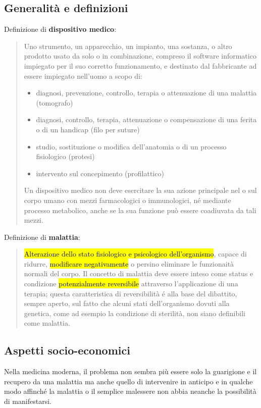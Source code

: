 \documentclass[a4paper]{article}
\begin{document}
\subsection{Generalità e definizioni}
Definizione di \textbf{dispositivo medico}:
\begin{quote}
    \centering
    Uno strumento, un apparecchio, un impianto, una sostanza, o altro prodotto 
    usato da solo o in combinazione, compreso il software informatico impiegato 
    per il suo corretto funzionamento, e destinato dal fabbricante ad essere 
    impiegato nell'uomo a scopo di:
    \begin{itemize}
        \item diagnosi, prevenzione, controllo, terapia o attenuazione di una 
        malattia (tomografo)
        \item diagnosi, controllo, terapia, attenuazione o compensazione di 
        una ferita o di un handicap (filo per suture)
        \item studio, sostituzione o modifica dell'anatomia o di un processo 
        fisiologico (protesi)
        \item intervento sul concepimento (profilattico)
    \end{itemize}
    Un dispositivo medico non deve esercitare la sua azione principale nel o 
    sul corpo umano con mezzi farmacologici o immunologici, né mediante processo 
    metabolico, anche se la sua funzione può essere coadiuvata da tali mezzi. 
\end{quote}
Definizione di \textbf{malattia}:
\begin{quote}
    \centering
    \hl{Alterazione dello stato fisiologico e psicologico dell'organismo}, capace di 
    ridurre, \hl{modificare negativamente} o persino eliminare le funzionaità normali 
    del corpo. Il concetto di malattia deve essere inteso come status e condizione 
    \hl{potenzialmente reversibile} attraverso l'applicazione di una terapia; questa 
    caratteristica di reversibilità é alla base del dibattito, sempre aperto, sul 
    fatto che alcuni stati dell'organismo dovuti alla genetica, come ad esempio la 
    condizione di sterilità, non siano definibili come malattia.
\end{quote}
\subsection{Aspetti socio-economici}
Nella medicina moderna, il problema non sembra più essere solo la guarigione e il 
recupero da una malattia ma anche quello di intervenire in anticipo e in qualche 
modo affinché la malattia o il semplice malessere non abbia neanche la possibilità 
di manifestarsi.
\end{document}
